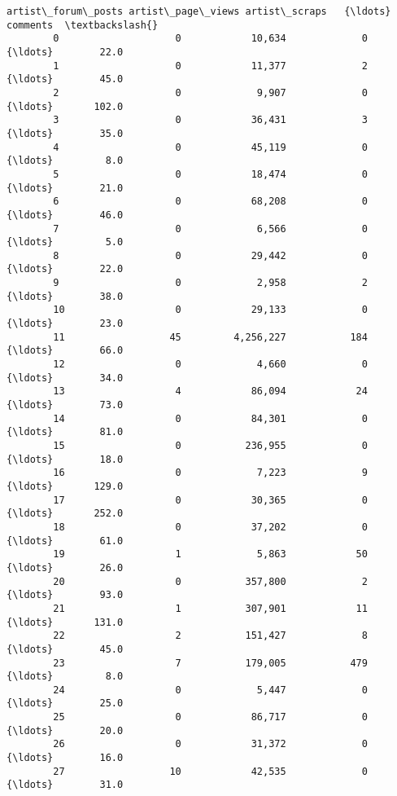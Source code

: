 \documentclass[11pt]{article}
\begin{document}
\begin{Verbatim}[commandchars=\\\{\}]
             artist\_forum\_posts artist\_page\_views artist\_scraps   {\ldots}    comments  \textbackslash{}
        0                    0            10,634             0    {\ldots}        22.0   
        1                    0            11,377             2    {\ldots}        45.0   
        2                    0             9,907             0    {\ldots}       102.0   
        3                    0            36,431             3    {\ldots}        35.0   
        4                    0            45,119             0    {\ldots}         8.0   
        5                    0            18,474             0    {\ldots}        21.0   
        6                    0            68,208             0    {\ldots}        46.0   
        7                    0             6,566             0    {\ldots}         5.0   
        8                    0            29,442             0    {\ldots}        22.0   
        9                    0             2,958             2    {\ldots}        38.0   
        10                   0            29,133             0    {\ldots}        23.0   
        11                  45         4,256,227           184    {\ldots}        66.0   
        12                   0             4,660             0    {\ldots}        34.0   
        13                   4            86,094            24    {\ldots}        73.0   
        14                   0            84,301             0    {\ldots}        81.0   
        15                   0           236,955             0    {\ldots}        18.0   
        16                   0             7,223             9    {\ldots}       129.0   
        17                   0            30,365             0    {\ldots}       252.0   
        18                   0            37,202             0    {\ldots}        61.0   
        19                   1             5,863            50    {\ldots}        26.0   
        20                   0           357,800             2    {\ldots}        93.0   
        21                   1           307,901            11    {\ldots}       131.0   
        22                   2           151,427             8    {\ldots}        45.0   
        23                   7           179,005           479    {\ldots}         8.0   
        24                   0             5,447             0    {\ldots}        25.0   
        25                   0            86,717             0    {\ldots}        20.0   
        26                   0            31,372             0    {\ldots}        16.0   
        27                  10            42,535             0    {\ldots}        31.0   

\end{Verbatim}
\end{document}
